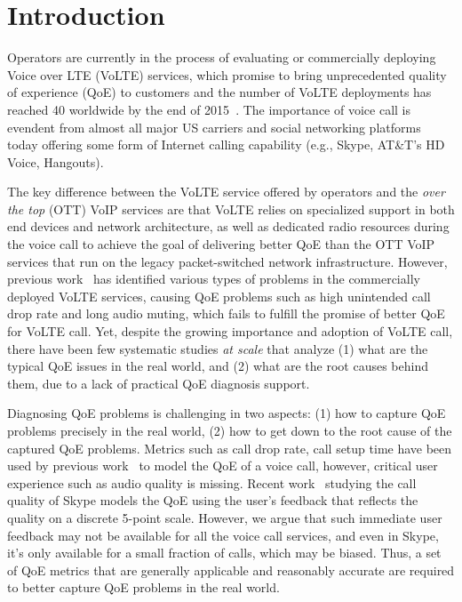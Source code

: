 

\section{Introduction}
\label{sec:intro}
Operators are currently in the process of evaluating or commercially deploying Voice over LTE (VoLTE) services, which promise to bring unprecedented quality of experience (QoE) to customers and the number of VoLTE deployments has reached 40 worldwide by the end of 2015~\cite{volte_number}. The importance of voice call is evendent from almost all major US carriers and social networking platforms today offering some form of Internet calling capability (e.g., Skype, AT\&T's HD Voice, Hangouts).

The key difference between the VoLTE service offered by operators and the \textit{over the top} (OTT) VoIP services are that VoLTE relies on specialized support in both end devices and network architecture, as well as dedicated radio resources during the voice call to achieve the goal of delivering better QoE than the OTT VoIP services that run on the legacy packet-switched network infrastructure. However, previous work~\cite{jia2015performance} has identified various types of problems in the commercially deployed VoLTE services, causing QoE problems such as high unintended call drop rate and long audio muting, which 
fails to fulfill the promise of better QoE for VoLTE call. Yet, despite the growing importance and adoption of VoLTE call, there have been few systematic studies \textit{at scale} that analyze (1) what are the typical QoE issues in the real world, and (2) what are the root causes behind them, due to a lack of practical QoE diagnosis support. 

Diagnosing QoE problems is challenging in two aspects: (1) how to capture QoE problems precisely in the real world, (2) how to get down to the root cause of the captured QoE problems. Metrics such as call drop rate, call setup time have been used by previous work~\cite{jia2015performance} to model the QoE of a voice call, however,  critical user experience such as audio quality is missing. Recent work~\cite{jiang2016improving} studying the call quality of Skype models the QoE using the user's feedback that reflects the quality on a discrete 5-point scale. However, we argue that such immediate user feedback may not be available for all the voice call services, and even in Skype, it's only available for a small fraction of calls, which may be biased. Thus, a set of QoE metrics that are generally applicable and reasonably accurate are required to better capture QoE problems in the real world.

